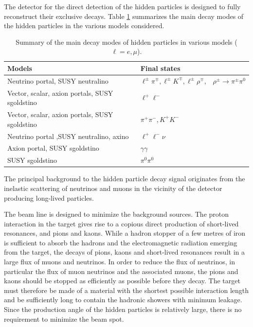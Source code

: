 	The detector for the direct detection of the hidden particles is designed to fully reconstruct their exclusive decays. Table \ref{table:req_decaymodes} summarizes the main decay modes of the hidden particles in the various models considered.
	
	\begin{table}[htb]
\begin{center}
\caption{Summary of the main decay modes of hidden particles in various models ($\ell = e, \mu$).}
\label{table:req_decaymodes}
\vspace{2mm}
\begin{tabular}{ll}
\hline
Models                         	& Final states              \\
\hline
Neutrino portal, SUSY neutralino                 & $\ell^{\pm}\pi^{\mp}, \ell^{\pm} K^{\mp}, \ell^{\pm}\rho^{\mp},\,\,\,\,\, \rho^{\pm}\rightarrow \pi^{\pm}\pi^0$ \\
Vector, scalar, axion portals, SUSY sgoldstino   & $\ell^+\ell^-$ \\
Vector, scalar, axion portals, SUSY sgoldstino   & $\pi^+\pi^-, K^+K^-$ \\
Neutrino portal ,SUSY neutralino, axino          & $\ell^+\ell^-\nu$ \\
Axion portal, SUSY sgoldstino                    & $\gamma\gamma$ \\
SUSY sgoldstino                                  & $\pi^0\pi^0$ \\
\hline
\end{tabular}
\end{center}
\end{table}

	The principal background to the hidden particle decay signal originates from the inelastic scattering of neutrinos and muons in the vicinity of the detector producing long-lived particles.
	
	The beam line is designed to minimize the background sources. The proton
interaction in the target gives rise to a copious direct production of short-lived resonances, and pions and kaons. While a hadron stopper of a few metres of iron is sufficient to absorb the hadrons and the electromagnetic radiation emerging from the target, the decays of pions, kaons and short-lived resonances result in a large flux of muons and neutrinos. In order to reduce the flux of neutrinos, in particular the flux of muon neutrinos and the associated muons, the pions and kaons should be stopped as efficiently as possible before they decay. The target must therefore be made of a material with the shortest possible interaction length and be sufficiently long to contain the hadronic showers with minimum leakage. Since the production angle of the  hidden particles is relatively large, there is no requirement to minimize the beam spot.

